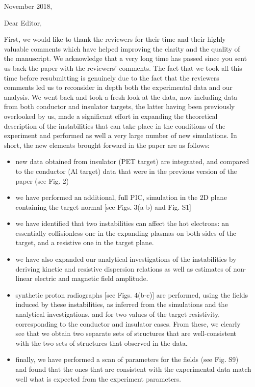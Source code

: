 \documentclass[aps,showpacs,superscriptaddress]{revtex4}%
\begin{document}
November 2018,

Dear Editor,

First, we would like to thank the reviewers for their time and their highly valuable comments which have helped improving the clarity and the quality of the manuscript. We acknowledge that a very long time has passed since you sent us back the paper with the reviewers' comments. 
The fact that we took all this time before resubmitting is genuinely due to the fact that the reviewers comments led us to reconsider in depth both the experimental data and our analysis. We went back and took a fresh look at the data, now including data from both conductor and insulator targets, the latter having been previously overlooked by us, made a significant effort in expanding the theoretical description of the instabilities that can take place in the conditions of the experiment and performed as well a very large number of new simulations. 
In short, the new elements brought forward in the paper are as follows:
\begin{itemize}
    \item new data obtained from insulator (PET target) are integrated, and compared to the conductor (Al target) data that were in the previous version of the paper (see Fig. 2)
    \item we have performed an additional, full PIC, simulation in the 2D plane containing the target normal [see Figs. 3(a-b) and Fig. S1]
    \item we have identified that two instabilities can affect the hot electrons: an essentially  collisionless one in the expanding plasmas on both sides of the target, and a resistive one in the target plane. 
    \item we have also expanded our analytical investigations of the instabilities by deriving kinetic and resistive dispersion relations as well as  estimates of    non-linear electric and magnetic field amplitude.
    \item synthetic proton radiographs [see Figs. 4(b-c)] are performed, using the fields induced by these instabilities, as inferred from the simulations and the analytical investigations, and for two values of the target resistivity, corresponding to the conductor and insulator cases. From these, we clearly see that we obtain two separate sets of structures that are well-consistent with the two sets of structures that observed in the data. 
    \item finally, we have performed a scan of parameters for the fields (see Fig. S9) and found that the ones that are consistent with the experimental data match well what is expected from the experiment parameters. 
\end{itemize}
\end{document}
